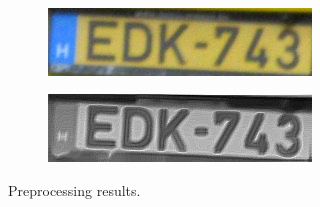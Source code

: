 \begin{figure}
\begin{subfigure}[b]{.45\textwidth}
    \end{subfigure}
    \hfill
    \\
    \begin{subfigure}[b]{.45\textwidth}
        \includegraphics[width=\textwidth]{figures/preprocessbefore3.jpg}
    \end{subfigure}
    \hfill
    \begin{subfigure}[b]{.45\textwidth}
        \includegraphics[width=\textwidth]{figures/preprocessafter3.jpg}
    \end{subfigure}
    \hfill
    \caption{Preprocessing results.}
    \label{fig:preprocessing-fig}
\end{figure}
